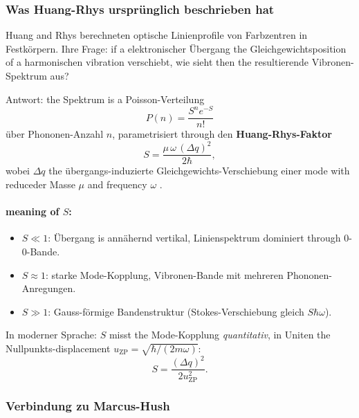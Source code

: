 \documentclass[11pt,a4paper,twoside]{article}
\theoremstyle{remark}
\begin{document}
\subsubsection*{Was Huang-Rhys urspr\"unglich beschrieben hat}

Huang and Rhys \cite{HuangRhys1950} berechneten optische Linienprofile
von Farbzentren in Festk\"orpern. Ihre Frage: if a elektronischer
\"Ubergang the Gleichgewichtsposition of a harmonischen vibration
verschiebt, wie sieht then the resultierende Vibronen-Spektrum aus?

Antwort: the Spektrum is a Poisson-Verteilung
\begin{equation}
  P(n) = \frac{S^n e^{-S}}{n!}
\end{equation}
\"uber Phononen-Anzahl $n$, parametrisiert through den
\textbf{Huang-Rhys-Faktor}
\begin{equation}
  S = \frac{\mu\,\omega\,(\Delta q)^2}{2\hbar},
  \label{eq:huang-rhys}
\end{equation}
wobei $\Delta q$ the \"ubergangs-induzierte Gleichgewichts-Verschiebung
einer mode with reduceder Masse $\mu$ and frequency $\omega$ .

\paragraph{meaning of $S$:}
\begin{itemize}\setlength{\itemsep}{0pt}
  \item $S \ll 1$: \"Ubergang is ann\"ahernd vertikal,
        Linienspektrum dominiert through 0-0-Bande.
  \item $S \approx 1$: starke Mode-Kopplung, Vibronen-Bande mit
        mehreren Phononen-Anregungen.
  \item $S \gg 1$: Gauss-f\"ormige Bandenstruktur (Stokes-Verschiebung
        gleich $S\hbar\omega$).
\end{itemize}

In moderner Sprache: $S$ misst the Mode-Kopplung \emph{quantitativ},
in Uniten the Nullpunkts-displacement
$u_\text{ZP} = \sqrt{\hbar/(2m\omega)}$:
\begin{equation}
  S = \frac{(\Delta q)^2}{2 u_\text{ZP}^2}.
  \label{eq:huang-rhys-units}
\end{equation}

\subsubsection*{Verbindung zu Marcus-Hush}
\end{document}

